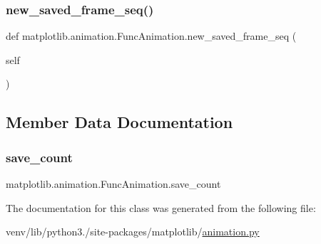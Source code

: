 \subsubsection{\texorpdfstring{new\+\_\+saved\+\_\+frame\+\_\+seq()}{new\_saved\_frame\_seq()}}
{\footnotesize\ttfamily def matplotlib.\+animation.\+Func\+Animation.\+new\+\_\+saved\+\_\+frame\+\_\+seq (\begin{DoxyParamCaption}\item[{}]{self }\end{DoxyParamCaption})}



\subsection{Member Data Documentation}
\mbox{\label{classmatplotlib_1_1animation_1_1FuncAnimation_a6d11b6844fe1906cf3048f9cd0cab8ea}} 
\subsubsection{\texorpdfstring{save\+\_\+count}{save\_count}}
{\footnotesize\ttfamily matplotlib.\+animation.\+Func\+Animation.\+save\+\_\+count}



The documentation for this class was generated from the following file\+:\begin{DoxyCompactItemize}
\item 
venv/lib/python3./site-\/packages/matplotlib/\hyperlink{animation_8py}{animation.\+py}\end{DoxyCompactItemize}
